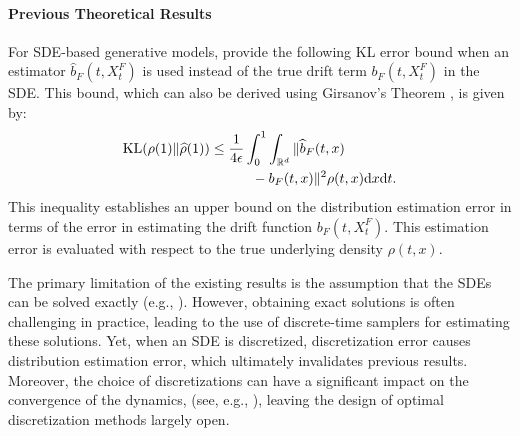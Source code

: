 \paragraph{Previous Theoretical Results}

For SDE-based generative models, \citet{interpolation} provide the following KL error bound when an estimator $\hat{b}_F(t,X_t^F)$ is used instead of the true drift term $b_F(t,X_t^F)$ in the SDE. This bound, which can also be derived using Girsanov's Theorem \cite{chen2023ddpm,pmlr-v202-oko23a}, is given by:
$$\begin{aligned}
    \textnormal{KL}(\rho(1)\Vert\widehat{\rho}(1))&\le\frac{1}{4\epsilon}\int_0^1\int_{\mathbb{R}^d}\Vert\widehat{b}_F(t,x)\\
    &\qquad\quad-b_F(t,x)\Vert^2\rho(t,x)\textnormal{d} x\textnormal{d} t.
\end{aligned}$$
This inequality establishes an upper bound on the distribution estimation error in terms of the error in estimating the drift function $b_F(t,X_t^F)$. This estimation error is evaluated with respect to the true underlying density $\rho(t,x)$. 

The primary limitation of the existing results is the assumption that the SDEs can be solved exactly (e.g.,  \citealt{chen2024forcasting, interpolation}). However, obtaining exact solutions is often challenging in practice, leading to the use of discrete-time samplers for estimating these solutions.
Yet, when an SDE is discretized, discretization error causes distribution estimation error, which ultimately invalidates  previous results. Moreover, the choice of discretizations can have a significant impact on the convergence of the dynamics, %
(see, e.g., \citealt{andre2016variational}), leaving the design of optimal discretization methods largely open.